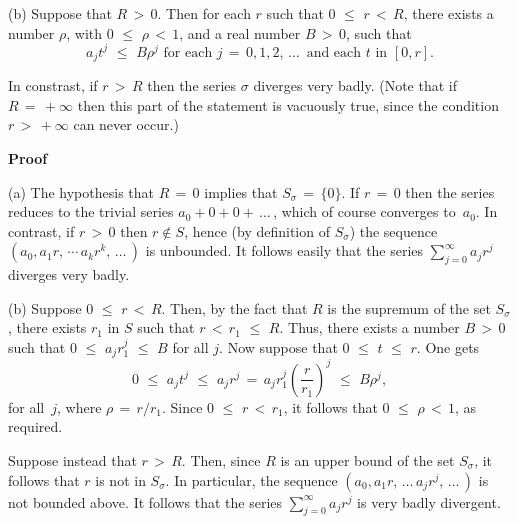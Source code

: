 \V

        (b) Suppose that $R\,>\,0$. Then for each $r$ such that $0\,\,{\leq}\,\,r\,<\,R$, there exists a number ${\rho}$,
    with $0\,\,{\leq}\,\,{\rho}\,<\,1$, and a real number $B\,>\,0$, such that
        \begin{displaymath}
        a_{j}t^{j}\,\,{\leq}\,\,B{\rho}^{j} \mbox{ for each $j \,=\, 0,1,2,\,{\ldots}\,$ and each $t$ in $[0,r]$}.
        \end{displaymath}

        In constrast, if $r\,>\,R$ then the series ${\sigma}$ diverges very badly.
    (Note that if $R \,=\, +{\infty}$ then this part of the statement is vacuously true, since the condition $r\,>\,+{\infty}$ can never occur.)

\V

        {\bf Proof}

\V

        (a) The hypothesis that $R \,=\, 0$ implies that $S_{{\sigma}} \,=\, \{0\}$. If $r \,=\, 0$ then the series reduces to the trivial series $a_{0} + 0 + 0 + \,{\ldots}\,$, which of course converges to~$a_{0}$.
    In contrast, if $r\,>\,0$ then $r\not\in S$, hence (by definition of $S_{{\sigma}}$) the sequence $(a_{0}, a_{1}r,  \,{\cdots}\,  a_{k}r^{k},\,{\ldots}\,)$ is unbounded.
    It follows easily that the series $\sum_{j=0}^{{\infty}} a_{j}r^{j}$ diverges very badly.

\V

        (b) Suppose $0\,\,{\leq}\,\,r\,<\,R$.
    Then, by the fact that $R$ is the supremum of the set $S_{{\sigma}}$, there exists $r_{1}$ in $S$ such that $r\,<\,r_{1}\,\,{\leq}\,\,R$.
    Thus, there exists a number $B\,>\,0$ such that $0\,\,{\leq}\,\,a_{j}r_{1}^{j}\,\,{\leq}\,\,B$ for all $j$.
    Now suppose that $0\,\,{\leq}\,\,t\,\,{\leq}\,\,r$. One gets
        \begin{displaymath}
        0\,\,{\leq}\,\,a_{j}t^{j}\,\,{\leq}\,\,a_{j}r^{j} \,=\, a_{j}r_{1}^{j}\left(\frac{r}{r_{1}}\right)^{j}\,\,{\leq}\,\,B{\rho}^{j},
        \end{displaymath}
    for all~$j$, where ${\rho} \,=\, r/r_{1}$.
    Since $0\,\,{\leq}\,\,r\,<\,r_{1}$, it follows that $0\,\,{\leq}\,\,{\rho}\,<\,1$, as required.

        Suppose instead that $r\,>\,R$. Then, since $R$ is an upper bound of the set $S_{{\sigma}}$, it follows that $r$ is not in $S_{{\sigma}}$.
    In particular, the sequence $(a_{0}, a_{1}r,\,{\ldots}\,a_{j}r^{j},\,{\ldots}\,)$ is not bounded above. It follows that the series $\sum_{j=0}^{{\infty}} a_{j}r^{j}$ is very badly divergent.

